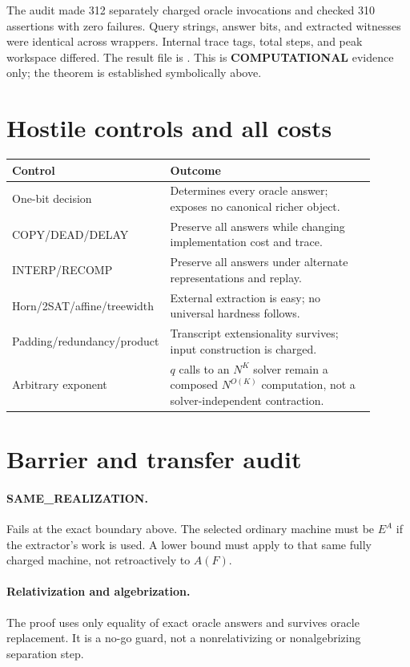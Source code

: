 \documentclass[11pt]{article}
\newcommand{\COMP}{\textbf{COMPUTATIONAL}}
\begin{document}
The audit made 312 separately charged oracle invocations and checked 310
assertions with zero failures.  Query strings, answer bits, and extracted
witnesses were identical across wrappers.  Internal trace tags, total steps,
and peak workspace differed.  The result file is
.
This is \COMP{} evidence only; the theorem is established symbolically above.

\section{Hostile controls and all costs}
\begin{center}
\begin{tabular}{>{\raggedright\arraybackslash}p{0.25\linewidth}p{0.65\linewidth}}
\toprule
Control & Outcome \\
\midrule
One-bit decision & Determines every oracle answer; exposes no canonical richer object.\\
COPY/DEAD/DELAY & Preserve all answers while changing implementation cost and trace.\\
INTERP/RECOMP & Preserve all answers under alternate representations and replay.\\
Horn/2SAT/affine/treewidth & External extraction is easy; no universal hardness follows.\\
Padding/redundancy/product & Transcript extensionality survives; input construction is charged.\\
Arbitrary exponent & $q$ calls to an $N^K$ solver remain a composed $N^{O(K)}$ computation, not a solver-independent contraction.\\
\bottomrule
\end{tabular}
\end{center}

\section{Barrier and transfer audit}
\paragraph{SAME\_REALIZATION.}
Fails at the exact boundary above.  The selected ordinary machine must be
$E^A$ if the extractor's work is used.  A lower bound must apply to that same
fully charged machine, not retroactively to $A(F)$.

\paragraph{Relativization and algebrization.}
The proof uses only equality of exact oracle answers and survives oracle
replacement.  It is a no-go guard, not a nonrelativizing or nonalgebrizing
separation step.
\end{document}

